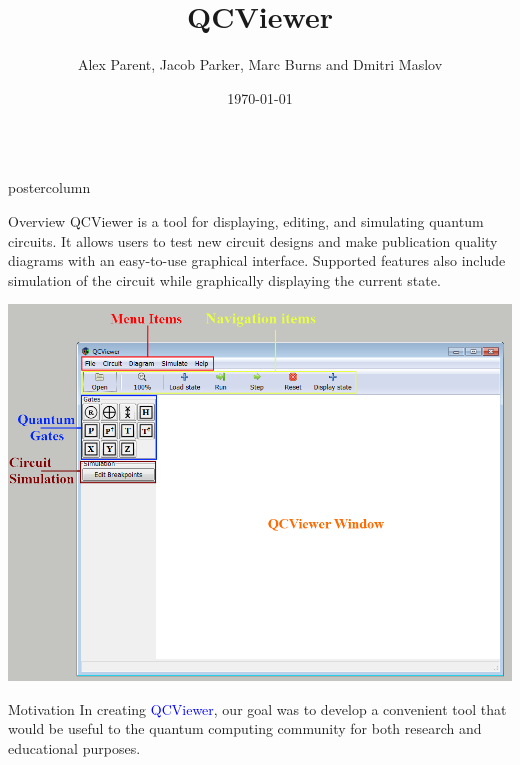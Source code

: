 \documentclass[final]{beamer} %
\title[QCViewer]{QCViewer}
\author[Author]{Alex Parent, Jacob Parker, Marc Burns and Dmitri Maslov}
\institute[IQC, University of Waterloo]{Quantum Circuits group, IQC, University of Waterloo}
\date{\today}
\begin{document}
    \begin{frame}{} 
    \begin{columns}
        \begin{column}{.33\textwidth}
        \begin{beamercolorbox}[center,wd=\textwidth]{postercolumn}
        \begin{minipage}[T]{.95\textwidth}
            \begin{block}{\large Overview}
	            QCViewer is a tool for displaying, editing, and simulating quantum circuits. 
                It allows users to test new circuit designs and make publication quality diagrams with an easy-to-use graphical interface. 
                Supported features also include simulation of the circuit while graphically displaying the current state.
                \begin{center} 
                    \includegraphics{figures/QCViewerGUI.png}
                \end{center}
            \end{block}
            \begin{block}{\large Motivation}
                In creating \textcolor{blue}{QCViewer}, our goal was to develop a convenient tool that would be useful to the quantum computing community for both research and educational purposes. 


\end{block}
\end{minipage}
\end{beamercolorbox}
\end{column}
\end{columns}
\end{frame}
\end{document}
